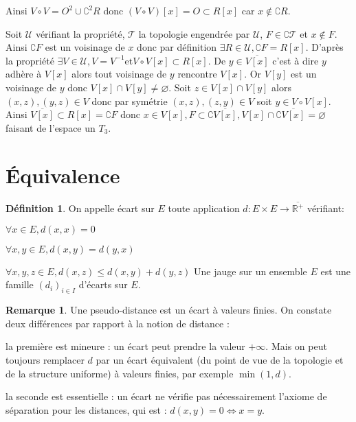 \documentclass[a4paper, 11pt, french]{book}
\newenvironment{itemise}{\itemize}{\enditemize}
\theoremstyle{plain} %
\theoremstyle{definition} %
\newtheorem{definition}{Définition}
\newtheorem{remarque}{Remarque}
\theoremstyle{remark} %
\newcommand{\1}{\mathds{1}}
\newcommand\vide{\varnothing}
\newcommand{\inv}[1]{#1^{-1}}
\newcommand{\et}{\mathrel{\mathrm{et}}}
\newcommand{\R}{\mathbb{R}}
\newcommand{\scr}[1]{\mathscr{#1}}
\begin{document}
{\begin{center}
	\end{center}
	Ainsi $V\circ V=O^2\cup\complement^2 R$ donc $(V\circ V)[x]=O\subset R[x]$ car $x\notin\complement R$.
}{
	Soit $\scr{U}$ vérifiant la propriété, $\scr{T}$ la topologie engendrée par $\scr{U}$, $F\in\complement\scr{T}$ et $x\notin F$.
	Ainsi $\complement F$ est un voisinage de $x$ donc par définition $\exists R\in\scr{U}, \complement F=R[x]$.
	D'après la propriété $\exists V\in\scr{U}, V=\inv{V}\et V\circ V[x]\subset R[x]$.
	De $y\in\overline{V[x]}$ c'est à dire $y$ adhère à $V[x]$ alors tout voisinage de $y$ rencontre $V[x]$.
	Or $V[y]$ est un voisinage de $y$ donc $V[x]\cap V[y]\neq\vide$.
	Soit $z\in V[x]\cap V[y]$ alors $(x, z), (y, z)\in V$ donc par symétrie $(x, z), (z, y)\in V$ soit $y\in V\circ V[x]$.
	Ainsi $\overline{V[x]}\subset R[x]=\complement F$ donc $x\in V[x], F\subset\complement\overline{V[x]}, V[x]\cap\complement\overline{V[x]}=\vide$ faisant de l'espace un $T_3$.	
}

\section{Équivalence}

\begin{definition}
	On appelle écart sur $E$ toute application $d:E\times E\rightarrow\overline{\R^+}$ vérifiant:
	\begin{itemise}
		\item $\forall x\in E, d(x, x)=0$
		\item $\forall x, y\in E, d(x, y)=d(y, x)$
		\item $\forall x, y, z\in E, d(x, z)\leqslant d(x, y)+d(y, z)$
	\end{itemise}
	Une jauge sur un ensemble $E$ est une famille $(d_i)_{i\in I}$ d'écarts sur $E$.
\end{definition}

\begin{remarque}
	Une pseudo-distance est un écart à valeurs finies.
	On constate deux différences par rapport à la notion de distance :
	\begin{itemise}
		\item la première est mineure : un écart peut prendre la valeur $+\infty$.
		Mais on peut toujours remplacer $d$ par un écart équivalent (du point de vue de la topologie et de la structure uniforme) à valeurs finies, par exemple $\min(1, d)$.
		\item la seconde est essentielle : un écart ne vérifie pas nécessairement l'axiome de séparation pour les distances, qui est : $d(x, y) = 0\iff x = y$.
	\end{itemise}
\end{remarque}
\end{document}
